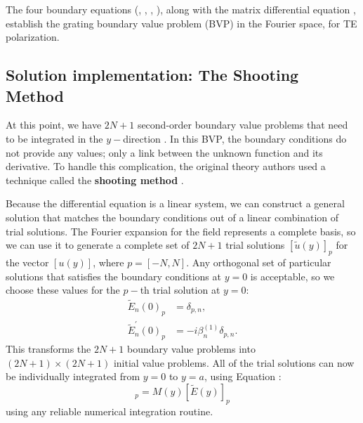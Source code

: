 The four boundary equations (, , , ), along with the matrix differential equation , establish the grating boundary value problem (BVP) in the Fourier space, for TE polarization.

\subsection{Solution implementation: The Shooting Method}
\label{shootingMethodDescription}
At this point, we have $2N+1$ second-order boundary value problems that need to be integrated in the $y-$direction .  In this BVP, the boundary conditions do not provide any values; only a link between the unknown function and its derivative.  To handle this complication, the original theory authors used a technique called the \textbf{{shooting method}} \cite{Pop01}.

Because the differential equation is a linear system, we can construct a general solution that matches the boundary conditions out of a linear combination of trial solutions.  The Fourier expansion for the field represents a complete basis, so we can use it to generate a complete set of $2N+1$ trial solutions $[\tilde u(y)]_p$ for the vector $[u(y)]$, where $p = [-N, N]$.  Any orthogonal set of particular solutions that satisfies the boundary conditions at $y=0$  is acceptable, so we choose these values for the $p-$th trial solution at $y=0$:
\begin{align}
\label{startingValues}
\tilde E_n(0)_{p} &= \delta_{p,n},\\
\tilde E_n^\prime(0)_{p} &= -i \beta_n^{(1)} \delta_{p,n}.
\end{align}
This transforms the $2N+1$ boundary value problems into $(2N+1)\times(2N+1)$ initial value problems.  All of the trial solutions can now be individually integrated from $y=0$ to $y=a$, using Equation :
\begin{equation}
[\tilde E^{\prime\prime}(y)]_p = M(y) [\tilde E(y)]_p
\label{matrixDE3}
\end{equation}
using any reliable numerical integration routine.

